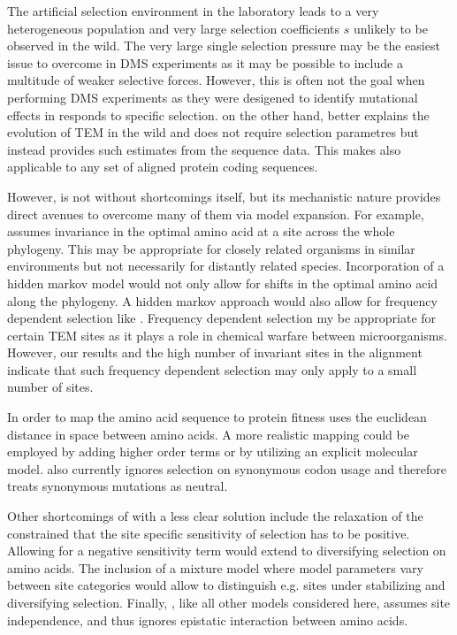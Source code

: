 \documentclass[12pt]{article}
\begin{document}
The artificial selection environment in the laboratory leads to a very heterogeneous population and very large selection coefficients $s$ unlikely to be observed in the wild.
The very large single selection pressure may be the easiest issue to overcome in DMS experiments as it may be possible to include a multitude of weaker selective forces.
However, this is often not the goal when performing DMS experiments as they were desigened to identify mutational effects in responds to specific selection.
\selac on the other hand, better explains the evolution of TEM in the wild and does not require selection parametres but instead provides such estimates from the sequence data.
This makes \selac also applicable to any set of aligned protein coding sequences.

However, \selac is  not without shortcomings itself, but its mechanistic nature provides direct avenues to overcome many of them via model expansion.
For example, \selac assumes invariance in the optimal amino acid at a site across the whole phylogeny.
This may be appropriate for closely related organisms in similar environments but not necessarily for distantly related species.
Incorporation of a hidden markov model would not only allow for shifts in the optimal amino acid along the phylogeny.
A hidden markov approach would also allow for frequency dependent selection like \gy.
Frequency dependent selection my be appropriate for certain TEM sites as it plays a role in chemical warfare between microorganisms.
However, our results and the high number of invariant sites in the alignment indicate that such frequency dependent selection may only apply to a small number of sites.

In order to map the amino acid sequence to protein fitness \selac uses the euclidean distance in \PC space between amino acids. 
A more realistic mapping could be employed by adding higher order terms or by utilizing an explicit molecular model.
\selac also currently ignores selection on synonymous codon usage and therefore treats synonymous mutations as neutral.

Other shortcomings of \selac with a less clear solution include the relaxation of the constrained that the site specific sensitivity of selection has to be positive.
Allowing for a negative sensitivity term would extend \selac to diversifying selection on amino acids.
The inclusion of a mixture model where model parameters vary between site categories would allow to distinguish e.g. sites under stabilizing and diversifying selection.
Finally, \selac, like all other models considered here, assumes site independence, and thus ignores epistatic interaction between amino acids.
\end{document}
